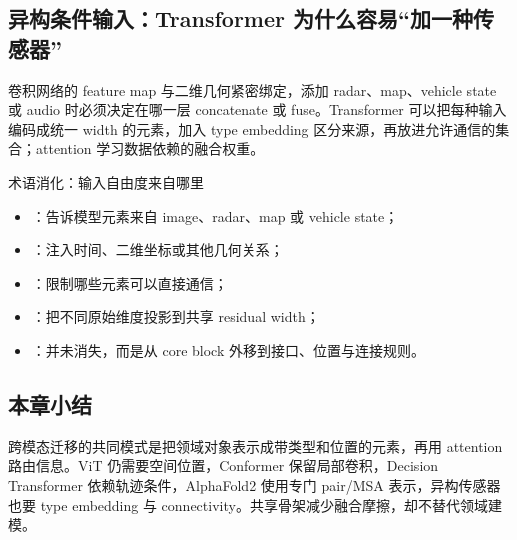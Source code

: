 \subsection{异构条件输入：Transformer 为什么容易“加一种传感器”}

卷积网络的 feature map 与二维几何紧密绑定，添加 radar、map、vehicle state 或 audio 时必须决定在哪一层 concatenate 或 fuse。Transformer 可以把每种输入编码成统一 width 的元素，加入 type embedding 区分来源，再放进允许通信的集合；attention 学习数据依赖的融合权重。


\begin{knowledgebox}{术语消化：输入自由度来自哪里}
\begin{itemize}
  \item {}：告诉模型元素来自 image、radar、map 或 vehicle state；
  \item {}：注入时间、二维坐标或其他几何关系；
  \item {}：限制哪些元素可以直接通信；
  \item {}：把不同原始维度投影到共享 residual width；
  \item {}：并未消失，而是从 core block 外移到接口、位置与连接规则。
\end{itemize}
\end{knowledgebox}


\subsection{本章小结}

跨模态迁移的共同模式是把领域对象表示成带类型和位置的元素，再用 attention 路由信息。ViT 仍需要空间位置，Conformer 保留局部卷积，Decision Transformer 依赖轨迹条件，AlphaFold2 使用专门 pair/MSA 表示，异构传感器也要 type embedding 与 connectivity。共享骨架减少融合摩擦，却不替代领域建模。

